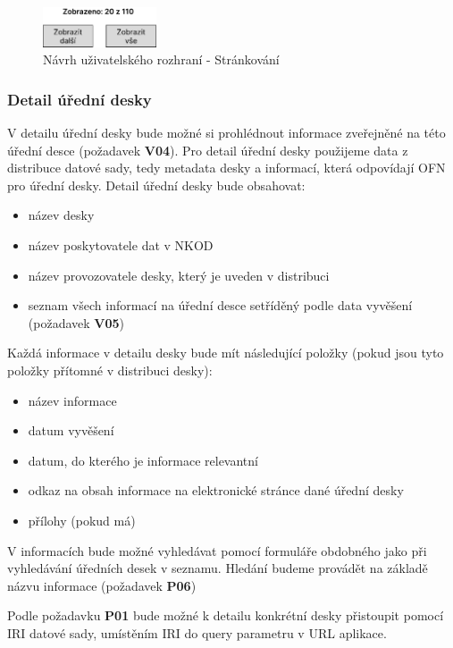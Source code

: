 \begin{figure} 
\begin{center}
\includegraphics[width=0.3\textwidth]{cs/obrazky/wireframes/wireframe_paging.pdf} 
\end{center}
\caption{Návrh uživatelského rozhraní - Stránkování}
\label{fig:paging}
\end{figure}

\subsubsection{Detail úřední desky}

V detailu úřední desky bude možné si prohlédnout informace zveřejněné na této úřední desce (požadavek \textbf{V04}). Pro detail úřední desky použijeme data z distribuce datové sady, tedy metadata desky a informací, která odpovídají OFN pro úřední desky. Detail úřední desky bude obsahovat:
\begin{itemize}
    \item název desky
    \item název poskytovatele dat v NKOD
    \item název provozovatele desky, který je uveden v distribuci
    \item seznam všech informací na úřední desce setříděný podle data vyvěšení (požadavek \textbf{V05})
\end{itemize}

Každá informace v detailu desky bude mít následující položky (pokud jsou tyto položky přítomné v distribuci desky): 
\begin{itemize}
    \item název informace
    \item datum vyvěšení
    \item datum, do kterého je informace relevantní
    \item odkaz na obsah informace na elektronické stránce dané úřední desky
    \item přílohy (pokud má)
\end{itemize}

V informacích bude možné vyhledávat pomocí formuláře obdobného jako při vyhledávání úředních desek v seznamu. Hledání budeme provádět na základě názvu informace (požadavek \textbf{P06})

Podle požadavku \textbf{P01} bude možné k detailu konkrétní desky přistoupit pomocí IRI datové sady, umístěním IRI do query parametru  v URL aplikace.

